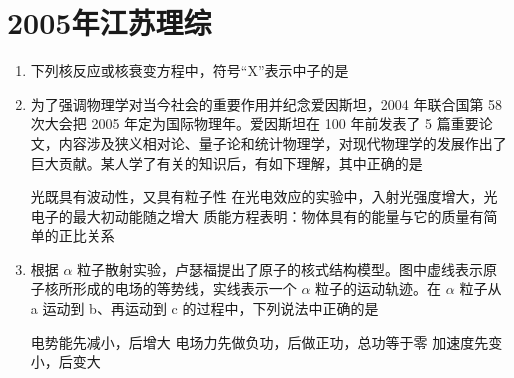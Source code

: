 \documentclass[\gkver]{gaokaozhenti}
\begin{document}
\chapter{2005年江苏理综}

\begin{enumerate}
\item
下列核反应或核衰变方程中，符号“X”表示中子的是

{}
{}
{}


\item
为了强调物理学对当今社会的重要作用并纪念爱因斯坦，2004 年联合国第 58 次大会把 2005 年定为国际物理年。爱因斯坦在 100 年前发表了 5 篇重要论文，内容涉及狭义相对论、量子论和统计物理学，对现代物理学的发展作出了巨大贡献。某人学了有关的知识后，有如下理解，其中正确的是

{光既具有波动性，又具有粒子性}
{在光电效应的实验中，入射光强度增大，光电子的最大初动能随之增大}
{质能方程表明：物体具有的能量与它的质量有简单的正比关系}


\item
根据 $\alpha$ 粒子散射实验，卢瑟福提出了原子的核式结构模型。图中虚线表示原子核所形成的电场的等势线，实线表示一个 $\alpha$ 粒子的运动轨迹。在 $\alpha$ 粒子从 a 运动到 b、再运动到 c 的过程中，下列说法中正确的是


{电势能先减小，后增大}
{电场力先做负功，后做正功，总功等于零}
{加速度先变小，后变大}


\end{enumerate}
\end{document}
